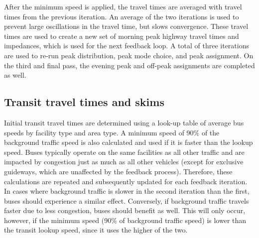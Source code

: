 \documentclass[
]{article}
\begin{document}
After the minimum speed is applied, the travel times are averaged with
travel times from the previous iteration. An average of the two
iterations is used to prevent large oscillations in the travel time, but
slows convergence. These travel times are used to create a new set of
morning peak highway travel times and impedances, which is used for the
next feedback loop. A total of three iterations are used to re-run peak
distribution, peak mode choice, and peak assignment. On the third and
final pass, the evening peak and off-peak assignments are completed as
well.

\subsection{Transit travel times and
skims}\label{transit-travel-times-and-skims}

Initial transit travel times are determined using a look-up table of
average bus speeds by facility type and area type. A minimum speed of
90\% of the background traffic speed is also calculated and used if it
is faster than the lookup speed. Buses typically operate on the same
facilities as all other traffic and are impacted by congestion just as
much as all other vehicles (except for exclusive guideways, which are
unaffected by the feedback process). Therefore, these calculations are
repeated and subsequently updated for each feedback iteration. In cases
where background traffic is slower in the second iteration than the
first, buses should experience a similar effect. Conversely, if
background traffic travels faster due to less congestion, buses should
benefit as well. This will only occur, however, if the minimum speed
(90\% of background traffic speed) is lower than the transit lookup
speed, since it uses the higher of the two.
\end{document}
